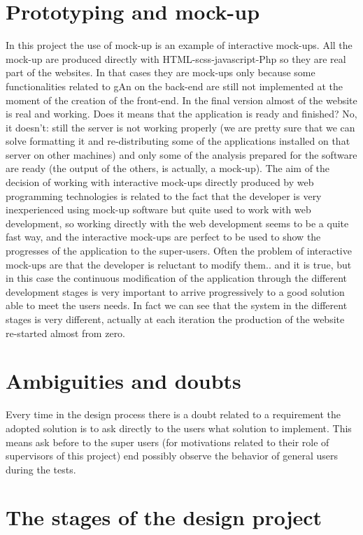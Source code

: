 \section{Prototyping and mock-up}
In this project the use of mock-up is an example of interactive mock-ups. All the mock-up are produced directly with HTML-scss-javascript-Php so they are real part of the websites. In that cases they are mock-ups only because some functionalities related to gAn on the back-end are still not implemented at the moment of the creation of the front-end. In the final version almost of the website is real and working. Does it means that the application is ready and finished? No, it doesn't: still the server is not working properly (we are pretty sure that we can solve formatting it and re-distributing some of the applications installed on that server on other machines) and only some of the analysis prepared for the software are ready (the output of the others, is actually, a mock-up). The aim of the decision of working with interactive mock-ups directly produced by web programming technologies is related to the fact that the developer is very inexperienced using mock-up software but quite used to work with web development, so working directly with the web development seems to be a quite fast way, and the interactive mock-ups are perfect to be used to show the progresses of the application to the super-users.
Often the problem of interactive mock-ups are that the developer is reluctant to modify them.. and it is true, but in this case the continuous modification of the application through the different development stages is very important to arrive progressively to a good solution able to meet the users needs. In fact we can see that the system in the different stages is very different, actually at each iteration the production of the website re-started almost from zero. 

\section{Ambiguities and doubts}
Every time in the design process there is a doubt related to a requirement the adopted solution is to ask directly to the users what solution to implement. This means ask before to the super users (for motivations related to their role of supervisors of this project) end possibly observe the behavior of general users during the tests. 

\section{The stages of the design project}

